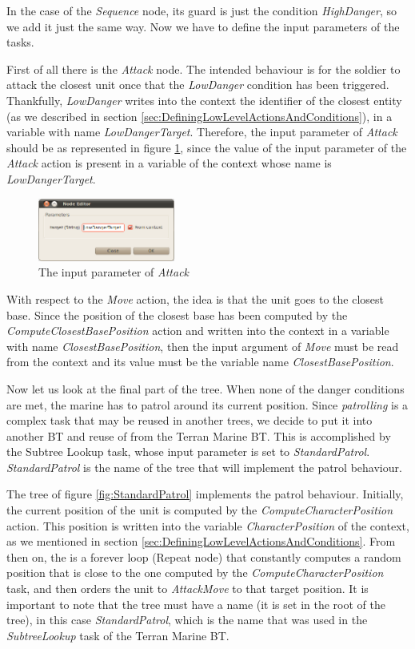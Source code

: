 \documentclass[a4paper]{article}
\begin{document}
In the case of the \textit{Sequence} node, its guard is just the condition \textit{HighDanger}, so we add it just the same way. Now we have to define the input parameters of the tasks.

First of all there is the \textit{Attack} node. The intended behaviour is for the soldier to attack the closest unit once that the \textit{LowDanger} condition has been triggered. Thankfully, \textit{LowDanger} writes into the context the identifier of the closest entity (as we described in section \ref{sec:DefiningLowLevelActionsAndConditions}), in a variable with name \textit{LowDangerTarget}. Therefore, the input parameter of \textit{Attack} should be as represented in figure \ref{fig:AttackParameter}, since the value of the input parameter of the \textit{Attack} action is present in a variable of the context whose name is \textit{LowDangerTarget}.

\begin{figure}
 \centering
 \includegraphics[width=0.4\textwidth]{./Images/AttackParameter.png}
 \caption{The input parameter of \textit{Attack}}
 \label{fig:AttackParameter}
\end{figure}

With respect to the \textit{Move} action, the idea is that the unit goes to the closest base. Since the position of the closest base has been computed by the \textit{ComputeClosestBasePosition} action and written into the context in a variable with name \textit{ClosestBasePosition}, then the input argument of \textit{Move} must be read from the context and its value must be the variable name \textit{ClosestBasePosition}.

Now let us look at the final part of the tree. When none of the danger conditions are met, the marine has to patrol around its current position. Since \textit{patrolling} is a complex task that may be reused in another trees, we decide to put it into another BT and reuse of from the Terran Marine BT. This is accomplished by the Subtree Lookup task, whose input parameter is set to \textit{StandardPatrol}. \textit{StandardPatrol} is the name of the tree that will implement the patrol behaviour.

The tree of figure \ref{fig:StandardPatrol} implements the patrol behaviour. Initially, the current position of the unit is computed by the \textit{ComputeCharacterPosition} action. This position is written into the variable \textit{CharacterPosition} of the context, as we mentioned in section \ref{sec:DefiningLowLevelActionsAndConditions}. From then on, the is a forever loop (Repeat node) that constantly computes a random position that is close to the one computed by the \textit{ComputeCharacterPosition} task, and then orders the unit to \textit{AttackMove} to that target position. It is important to note that the tree must have a name (it is set in the root of the tree), in this case \textit{StandardPatrol}, which is the name that was used in the \textit{SubtreeLookup} task of the Terran Marine BT.
\end{document}
